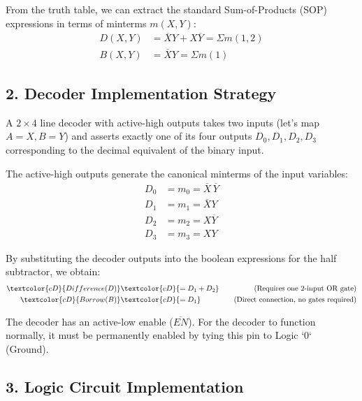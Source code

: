 \documentclass[12pt,a3paper]{article}
\begin{document}
\begin{enumerate}
\begin{tcolorbox}[enhanced,breakable,ansbox,colback=cD!4,colframe=cD,boxrule=0.8pt,arc=5pt,title={\textbf{Answer}},fonttitle=\bfseries\color{white},colbacktitle=cD]
From the truth table, we can extract the standard Sum-of-Products (SOP) expressions in terms of minterms $m(X, Y)$:
\begin{align*}
    D(X,Y) &= \overline{X}Y + X\overline{Y} = \Sigma m(1, 2) \\
    B(X,Y) &= \overline{X}Y = \Sigma m(1)
\end{align*}

\subsection*{2. Decoder Implementation Strategy}
A $2 \times 4$ line decoder with active-high outputs takes two inputs (let's map $A = X, B = Y$) and asserts exactly one of its four outputs $D_0, D_1, D_2, D_3$ corresponding to the decimal equivalent of the binary input. 

The active-high outputs generate the canonical minterms of the input variables:
\begin{align*}
    D_0 &= m_0 = \overline{X}\,\overline{Y} \\
    D_1 &= m_1 = \overline{X}Y \\
    D_2 &= m_2 = X\overline{Y} \\
    D_3 &= m_3 = XY
\end{align*}

By substituting the decoder outputs into the boolean expressions for the half subtractor, we obtain:
\begin{align*}
    \textcolor{cD}{Difference (D)} &\textcolor{cD}{= D_1 + D_2} \quad &\text{(Requires one 2-input OR gate)} \\
    \textcolor{cD}{Borrow (B)} &\textcolor{cD}{= D_1} \quad &\text{(Direct connection, no gates required)}
\end{align*}

The decoder has an active-low enable ($\overline{EN}$). For the decoder to function normally, it must be permanently enabled by tying this pin to Logic `0` (Ground).

\vspace{0.4cm}
\subsection*{3. Logic Circuit Implementation}

\vspace{0.2cm}
\begin{center}
\begin{circuitikz}[scale=1.1, transform shape, thick]
    

\end{circuitikz}
\end{center}
\end{tcolorbox}
\end{enumerate}
\end{document}

